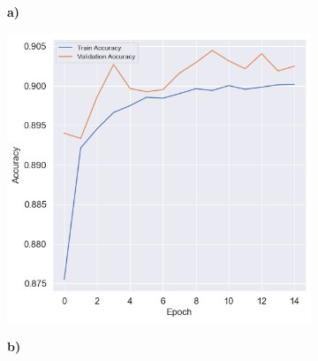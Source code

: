 \begin{figure}[!htbp]
\begin{center}
    \begin{minipage}[b]{0.5\textwidth}
        \centering
        \begin{subfigure}[t]{0.06\textwidth}
            \textbf{a)}
        \end{subfigure}
        \begin{subfigure}[t]{0.9\textwidth}
            \includegraphics[width=\linewidth, valign=t]{images/Model_Training/Initial_Training_History_square.png}
        \end{subfigure}
    \end{minipage}%
    \begin{minipage}[b]{0.5\textwidth}
        \centering
        \begin{subfigure}[t]{0.06\textwidth}
            \textbf{b)}
        \end{subfigure}
        \begin{subfigure}[t]{0.9\textwidth}

\end{subfigure}
\end{minipage}
\end{center}
\end{figure}
